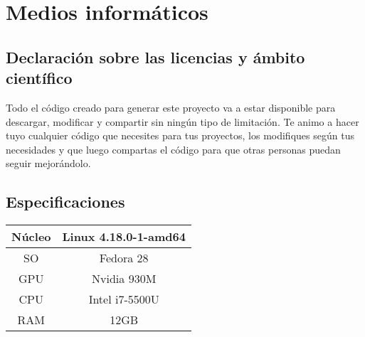 \chapter*{Medios informáticos}
\section*{Declaración sobre las licencias y ámbito científico}

Todo el código creado para generar este proyecto va a estar disponible para descargar, modificar y compartir sin ningún tipo de limitación. Te animo a hacer tuyo cualquier código que necesites para tus proyectos, los modifiques según tus necesidades y que luego compartas el código para que otras personas puedan seguir mejorándolo.

\section*{Especificaciones}
\begin{table}[htbp]
	\centering %
	\begin{tabular}{|c|c|}
		
		\hline
		Núcleo & Linux 4.18.0-1-amd64 \\ \hline
		SO & Fedora 28 \\ \hline
		GPU & Nvidia 930M \\ \hline
		CPU & Intel i7-5500U \\ \hline
		RAM & 12GB \\
		\hline
	\end{tabular}
	\label{tab:specs}
\end{table}